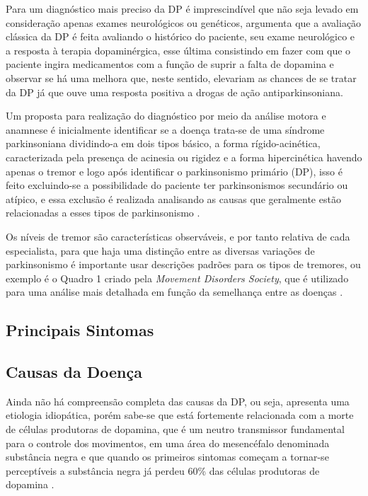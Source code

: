 \documentclass[
	12pt,				%
	openany,			%
	oneside,			%
	a4paper,			%
	english,			%
	french,				%
	spanish,			%
	brazil				%
	]{abntex2}
\begin{document}
Para um diagnóstico mais preciso da DP é imprescindível que não seja levado em consideração apenas exames neurológicos ou genéticos,  argumenta que a avaliação clássica da DP é feita avaliando o histórico do paciente, seu exame neurológico e a resposta à terapia dopaminérgica, esse última consistindo em fazer com que o paciente ingira medicamentos com a função de suprir a falta de dopamina e observar se há uma melhora que, neste sentido, elevariam as chances de se tratar da DP já que ouve uma resposta positiva a drogas de ação antiparkinsoniana.

Um proposta para realização do diagnóstico por meio da análise motora e anamnese é inicialmente identificar se a doença trata-se de uma síndrome parkinsoniana dividindo-a em dois tipos básico, a forma rígido-acinética, caracterizada pela presença de acinesia ou rigidez e a forma hipercinética havendo apenas o tremor e logo após identificar o parkinsonismo primário (DP), isso é feito excluindo-se a possibilidade do paciente ter parkinsonismos secundário ou atípico, e essa exclusão é realizada analisando as causas que geralmente estão relacionadas a esses tipos de parkinsonismo \cite{barbosa2005}.

Os níveis de tremor são características observáveis, e por tanto relativa de cada especialista, para que haja uma distinção entre as diversas variações de parkinsonismo é importante usar descrições padrões para os tipos de tremores, ou exemplo é o Quadro 1 criado pela \textit{Movement Disorders Society}, que é utilizado para uma análise mais detalhada em função da semelhança entre as doenças \cite{barbosa2005}.


\subsection{Principais Sintomas}
\subsection{Causas da Doença}

Ainda não há compreensão completa das causas da DP, ou seja, apresenta uma etiologia idiopática, porém sabe-se que está fortemente relacionada com a morte de células produtoras de dopamina, que é um neutro transmissor fundamental para o controle dos movimentos, em uma área do mesencéfalo denominada substância negra e que quando os primeiros sintomas começam a tornar-se perceptíveis a substância negra já perdeu 60\% das células produtoras de dopamina \cite{moreira2007}.
\end{document}
